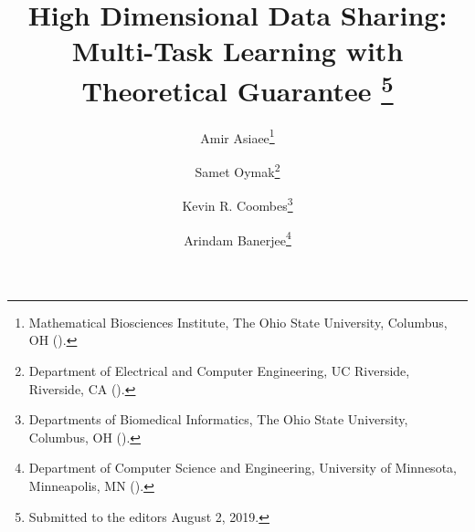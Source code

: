 
\title{High Dimensional Data Sharing: \\ Multi-Task Learning with Theoretical Guarantee \thanks{Submitted to the editors August 2, 2019.
}}

\author{Amir Asiaee\thanks{Mathematical Biosciences Institute, The Ohio State University, Columbus, OH
  ().}
\and Samet Oymak\thanks{Department of Electrical and Computer Engineering, UC Riverside, Riverside, CA
  ().}
\and Kevin R. Coombes\thanks{Departments of Biomedical Informatics, The Ohio State University, Columbus, OH
	().}
\and Arindam Banerjee\thanks{Department of Computer Science and Engineering, University of Minnesota, Minneapolis, MN
	().}
}


\usepackage{amsopn}
\DeclareMathOperator{\diag}{diag}



